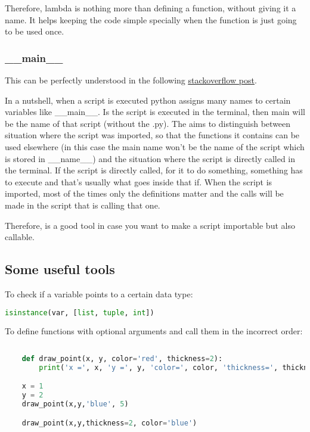 Therefore, lambda is nothing more than defining a function, without giving it a name. It helps keeping the code simple specially when the function is just going to be used once.




\subsubsection{\_\_main\_\_}
This can be perfectly understood in the following \href{https://stackoverflow.com/questions/419163/what-does-if-name-main-do}{\ul{stackoverflow post}}.

In a nutshell, when a script is executed python assigns many names to certain variables like \_\_main\_\_. Is the script is executed in the terminal, then main will be the name of that script (without the .py). The  aims to distinguish between situation where the script was imported, so that the functions it contains can be used elsewhere (in this case the main name won't be the name of the script which is stored in \_\_name\_\_) and the situation where the script is directly called in the terminal. If the script is directly called, for it to do something, something has to execute and that's usually what goes inside that if. When the script is imported, most of the times only the definitions matter and the calls will be made in the script that is calling that one. 

Therefore, is a good tool in case you want to make a script importable but also callable.

\subsection{Some useful tools}
To check if a variable points to a certain data type:
\begin{lstlisting}[language=python]
    isinstance(var, [list, tuple, int])
\end{lstlisting}

\vspace{1cm}
To define functions with optional arguments and call them in the incorrect order:

\begin{lstlisting}[language=python]
    
    def draw_point(x, y, color='red', thickness=2): 
        print('x =', x, 'y =', y, 'color=', color, 'thickness=', thickness)

    x = 1
    y = 2
    draw_point(x,y,'blue', 5)

    draw_point(x,y,thickness=2, color='blue')

\end{lstlisting}







